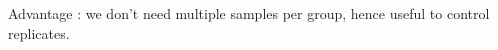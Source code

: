 \documentclass[12pt]{amsart}
\newcommand{\gimli}{\texttt{gimli}}
\begin{document}
Advantage : we don't need multiple samples per group, hence useful to control
replicates.










\end{document}

